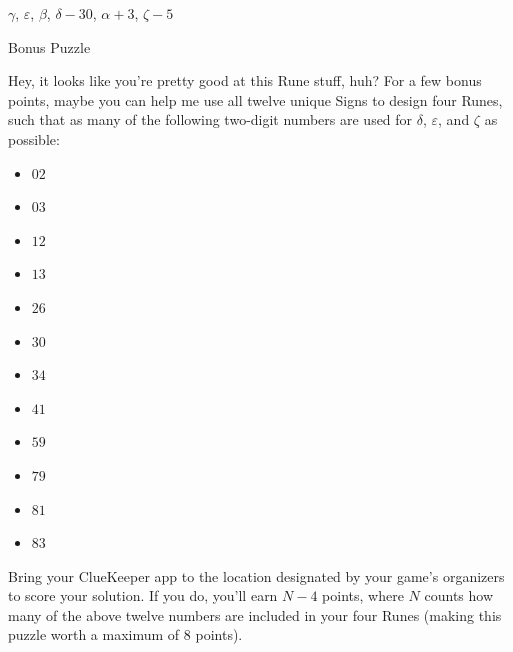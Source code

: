 \documentclass{article}
\newcommand{\clue}[1]{#1}
\begin{document}
{\begin{center}

\vspace{2em}

{\Huge \(\gamma\), \(\varepsilon\), \(\beta\), \(\delta-30\), \(\alpha+3\), \(\zeta-5\)}

\end{center}
}


\newpage


\clue{
Bonus Puzzle

Hey, it looks like you're pretty good at this Rune stuff, huh? For a few bonus
points, maybe you can help me use all twelve unique Signs to
design four Runes, such that as many of the following
two-digit numbers are used for \(\delta\), \(\varepsilon\), and \(\zeta\) as possible:

\begin{itemize}
\item \(02\)
\item \(03\)
\item \(12\)
\item \(13\)
\item \(26\)
\item \(30\)
\item \(34\)
\item \(41\)
\item \(59\)
\item \(79\)
\item \(81\)
\item \(83\)
\end{itemize}

Bring your ClueKeeper app to the location designated by your game's organizers
to score your solution. If you do, you'll earn \(N-4\) points,
where \(N\) counts how many of the above twelve numbers are included in your four Runes
(making this puzzle worth a maximum of \(8\) points).
}

\newpage
\end{document}
